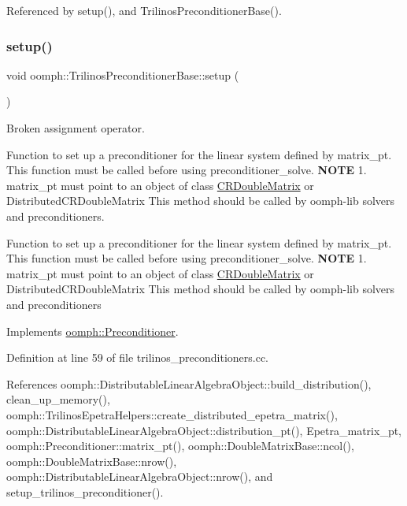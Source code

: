 Referenced by setup(), and Trilinos\+Preconditioner\+Base().

\mbox{\label{classoomph_1_1TrilinosPreconditionerBase_aaef80c74c1d94a42420e3362194efce9}} 
\subsubsection{\texorpdfstring{setup()}{setup()}\hspace{0.1cm}{\footnotesize\ttfamily [1/2]}}
{\footnotesize\ttfamily void oomph\+::\+Trilinos\+Preconditioner\+Base\+::setup (\begin{DoxyParamCaption}{ }\end{DoxyParamCaption})\hspace{0.3cm}{\ttfamily [virtual]}}



Broken assignment operator. 

Function to set up a preconditioner for the linear system defined by matrix\+\_\+pt. This function must be called before using preconditioner\+\_\+solve. {\bfseries N\+O\+TE} 1. matrix\+\_\+pt must point to an object of class \hyperlink{classoomph_1_1CRDoubleMatrix}{C\+R\+Double\+Matrix} or Distributed\+C\+R\+Double\+Matrix This method should be called by oomph-\/lib solvers and preconditioners.

Function to set up a preconditioner for the linear system defined by matrix\+\_\+pt. This function must be called before using preconditioner\+\_\+solve. {\bfseries N\+O\+TE} 1. matrix\+\_\+pt must point to an object of class \hyperlink{classoomph_1_1CRDoubleMatrix}{C\+R\+Double\+Matrix} or Distributed\+C\+R\+Double\+Matrix This method should be called by oomph-\/lib solvers and preconditioners 

Implements \hyperlink{classoomph_1_1Preconditioner_af4886f4efe510e5c9b0eb19422943588}{oomph\+::\+Preconditioner}.



Definition at line 59 of file trilinos\+\_\+preconditioners.\+cc.



References oomph\+::\+Distributable\+Linear\+Algebra\+Object\+::build\+\_\+distribution(), clean\+\_\+up\+\_\+memory(), oomph\+::\+Trilinos\+Epetra\+Helpers\+::create\+\_\+distributed\+\_\+epetra\+\_\+matrix(), oomph\+::\+Distributable\+Linear\+Algebra\+Object\+::distribution\+\_\+pt(), Epetra\+\_\+matrix\+\_\+pt, oomph\+::\+Preconditioner\+::matrix\+\_\+pt(), oomph\+::\+Double\+Matrix\+Base\+::ncol(), oomph\+::\+Double\+Matrix\+Base\+::nrow(), oomph\+::\+Distributable\+Linear\+Algebra\+Object\+::nrow(), and setup\+\_\+trilinos\+\_\+preconditioner().



